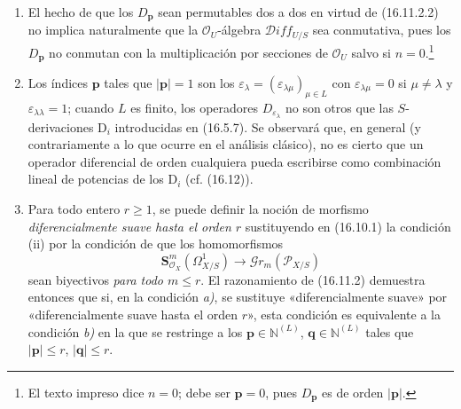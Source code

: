 \begin{remarks}[16.11.3]
\label{IV.16.11.3}
\begin{enumerate}
  \item[(i)] El hecho de que los $D_{\mathbf{p}}$ sean permutables dos a dos en
  virtud de (16.11.2.2) no implica naturalmente que la
  $\mathcal{O}_U$-álgebra $\mathscr{D}\!iff_{U/S}$ sea conmutativa, pues los
  $D_{\mathbf{p}}$ no conmutan con la multiplicación por secciones de
  $\mathcal{O}_U$ salvo si $n=0$.\footnote{El texto impreso dice
  $n=0$; debe ser $\mathbf{p}=0$, pues $D_{\mathbf{p}}$ es de orden
  $|\mathbf{p}|$.}
  \item[(ii)] Los índices $\mathbf{p}$ tales que $|\mathbf{p}|=1$ son los
  $\varepsilon_\lambda
  =(\varepsilon_{\lambda\mu})_{\mu\in L}$ con
  $\varepsilon_{\lambda\mu}=0$ si $\mu\neq\lambda$ y
  $\varepsilon_{\lambda\lambda}=1$; cuando $L$ es finito, los operadores
  $D_{\varepsilon_\lambda}$ no son otros que las
  $S$-derivaciones $\mathrm{D}_i$ introducidas en (16.5.7). Se observará que, en general
  (y contrariamente a lo que ocurre en el análisis clásico), no es cierto que
  un operador diferencial de orden cualquiera pueda escribirse como combinación
  lineal de potencias de los $\mathrm{D}_i$ (cf. (16.12)).
  \item[(iii)] Para todo entero $r\geq1$, se puede definir la noción de
  morfismo \emph{diferencialmente suave hasta el orden $r$} sustituyendo
  en (16.10.1) la condición (ii) por la condición de que los homomorfismos
  \[
    \mathbf{S}_{\mathcal{O}_X}^m(\varOmega_{X/S}^1)
    \longrightarrow\mathscr{G}r_m(\mathscr{P}_{X/S})
  \]
  sean biyectivos \emph{para todo $m\leq r$}. El razonamiento de (16.11.2)
  demuestra entonces que si, en la condición \emph{a)}, se sustituye «diferencialmente
  suave» por «diferencialmente suave hasta el orden $r$», esta condición es
  equivalente a la condición \emph{b)} en la que se restringe a los
  $\mathbf{p}\in\mathbb{N}^{(L)}$, $\mathbf{q}\in\mathbb{N}^{(L)}$ tales que
  $|\mathbf{p}|\leq r$, $|\mathbf{q}|\leq r$.
\end{enumerate}
\end{remarks}
